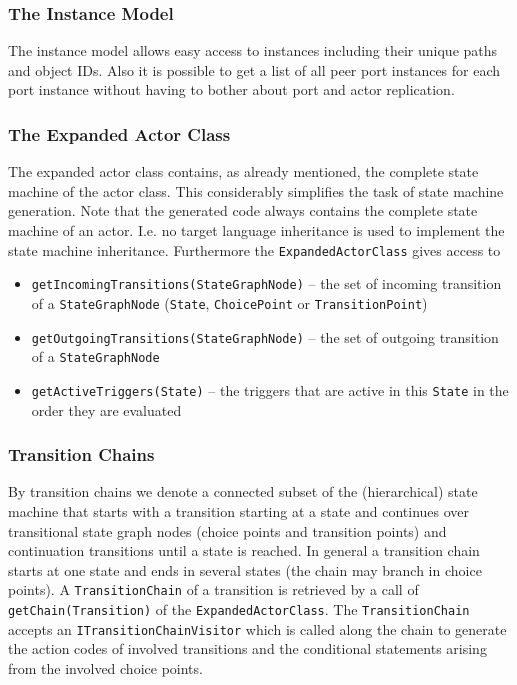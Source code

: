 \subsubsection{The Instance Model}

The instance model allows easy access to instances including their unique paths and object IDs. Also it is 
possible to get a list of all peer port instances for each port instance without having to bother about 
port and actor replication.

\subsubsection{The Expanded Actor Class}

The expanded actor class contains, as already mentioned, the complete state machine of the actor class. 
This considerably simplifies the task of state machine generation. Note that the generated code always 
contains the complete state machine of an actor. I.e. no target language inheritance is used to implement 
the state machine inheritance.
Furthermore the \texttt{ExpandedActorClass} gives access to
\begin{itemize}
\item \texttt{getIncomingTransitions(StateGraphNode)} -- the set of incoming transition of a 
\texttt{StateGraphNode} (\texttt{State}, \texttt{ChoicePoint} or \texttt{TransitionPoint})
\item \texttt{getOutgoingTransitions(StateGraphNode)} -- the set of outgoing transition of a 
\texttt{StateGraphNode}
\item \texttt{getActiveTriggers(State)} -- the triggers that are active in this \texttt{State} in the 
order they are evaluated
\end{itemize}

\subsubsection{Transition Chains}

By transition chains we denote a connected subset of the (hierarchical) state machine that starts with a 
transition starting at a state and continues over transitional state graph nodes (choice points and 
transition points) and continuation transitions until a state is reached. In general a transition chain 
starts at one state and ends in several states (the chain may branch in choice points).
A \texttt{TransitionChain} of a transition is retrieved by a call of \texttt{getChain(Transition)} of the 
\texttt{ExpandedActorClass}.
The \texttt{TransitionChain} accepts an \texttt{ITransitionChainVisitor} which is called along the chain 
to generate the action codes of involved transitions and the conditional statements arising from the 
involved choice points. 

